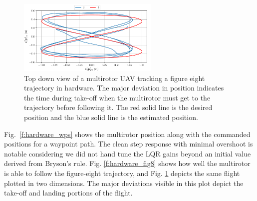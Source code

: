 \begin{figure}
  \centering
  \includegraphics[width=0.6\textwidth]{figures/mocap_fig8_position_2d}
  \caption[Top-Down View of LQR Hardware Trajectory Results]{Top down view of a multirotor UAV tracking a figure eight
  trajectory in hardware. The major deviation in position indicates the time
during take-off when the multirotor must get to the trajectory before following
it. The red solid line is the desired position and the blue solid line is the
estimated position.}
  \label{f:hardware_fig8_2d}
\end{figure}

Fig.~\ref{f:hardware_wps} shows the multirotor position along with the commanded
positions for a waypoint path. The clean step response with minimal overshoot is
notable considering we did not hand tune the LQR gains beyond an initial value
derived from Bryson's rule. Fig. \ref{f:hardware_fig8} shows how well the
multirotor is able to follow the figure-eight trajectory, and Fig.
\ref{f:hardware_fig8_2d} depicts the same flight plotted in two dimensions. The
major deviations visible in this plot depict the take-off and landing portions
of the flight.
